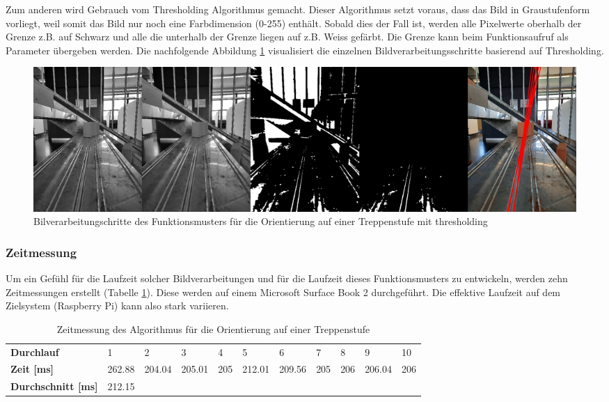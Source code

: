 Zum anderen wird Gebrauch vom Thresholding Algorithmus\cite{OpenCV-Threshold} gemacht. Dieser Algorithmus setzt voraus, dass das Bild in Graustufenform vorliegt, weil somit das Bild nur noch eine Farbdimension (0-255) enthält. Sobald dies der Fall ist, werden alle Pixelwerte oberhalb der Grenze z.B. auf Schwarz und alle die unterhalb der Grenze liegen auf z.B. Weiss gefärbt. Die Grenze kann beim Funktionsaufruf als Parameter übergeben werden. Die nachfolgende Abbildung \ref{fig:bildverarbeitungsschritte-threshold} visualisiert die einzelnen Bildverarbeitungsschritte basierend auf Thresholding.
\begin{figure}[H]
  \includegraphics[width=1.0\textwidth]{img/orientierung-treppenstufe/collageThresh.jpg}
  \centering
  \caption{Bilverarbeitungschritte des Funktionsmusters für die Orientierung auf einer Treppenstufe mit thresholding}
  \label{fig:bildverarbeitungsschritte-threshold}
\end{figure}
  
\newpage
\subsubsection{Zeitmessung}
Um ein Gefühl für die Laufzeit solcher Bildverarbeitungen und für die Laufzeit dieses Funktionsmusters zu entwickeln, werden zehn Zeitmessungen erstellt (Tabelle \ref{tab:zeitmessung-bildverarbeitung}). Diese werden auf einem Microsoft Surface Book 2 durchgeführt. Die effektive Laufzeit auf dem Zielsystem (Raspberry Pi) kann also stark variieren.

\begin{center}
\begin{table}[H]
    \begin{tabular}{l|l|l|l|l|l|l|l|l|l|l}
        \textbf{Durchlauf} & 1 & 2 & 3 & 4 & 5 & 6 & 7 & 8 & 9 & 10 \\
        \textbf{Zeit [ms]} & 262.88 & 204.04 & 205.01 & 205 & 212.01 & 209.56 & 205 & 206 & 206.04 & 206 \\
        \textbf{Durchschnitt [ms]} & 212.15 \\
    \end{tabular}
    \caption{Zeitmessung des Algorithmus für die Orientierung auf einer Treppenstufe}
    \label{tab:zeitmessung-bildverarbeitung}
\end{table}
\end{center}

